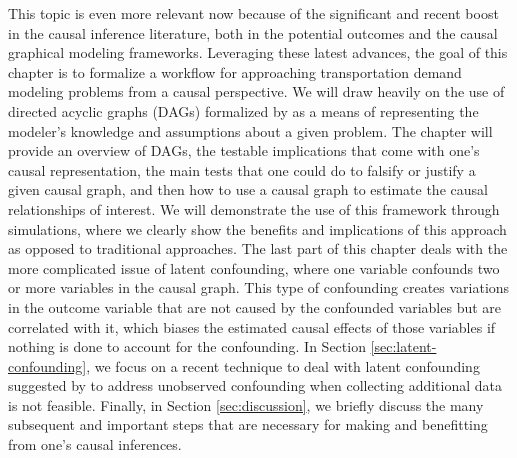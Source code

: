 This topic is even more relevant now because of the significant and recent boost in the causal inference literature, both in the potential outcomes and the causal graphical modeling frameworks.
Leveraging these latest advances, the goal of this chapter is to formalize a workflow for approaching 
transportation demand modeling problems from a causal perspective. 
We will draw heavily on the use of directed acyclic graphs (DAGs) formalized by \citet{pearl_causality_2000} as a means of representing the modeler's knowledge and assumptions about a given problem. 
The chapter will provide an overview of DAGs, the 
testable implications that come with one's causal representation, the main 
tests that one could do to falsify or justify a given causal graph, and then how 
to use a causal graph to estimate the causal relationships of interest. 
We will demonstrate the use of this framework through simulations, where we 
clearly show the benefits and implications of this approach as opposed to 
traditional approaches. 
The last part of this chapter deals with the more complicated issue of latent 
confounding, where one variable confounds two or more variables in the causal 
graph. This type of confounding creates variations in the outcome variable that are not caused by 
the confounded variables but are correlated with it, which biases the estimated 
causal effects of those variables if nothing is done to account for the 
confounding. 
In Section \ref{sec:latent-confounding}, we focus on a recent technique to deal with latent confounding suggested by \citet{wang_2019_blessings} to address unobserved confounding when collecting additional data is not feasible. 
Finally, in Section \ref{sec:discussion}, we briefly discuss the many subsequent and important steps that are necessary for making and benefitting from one's causal inferences.
